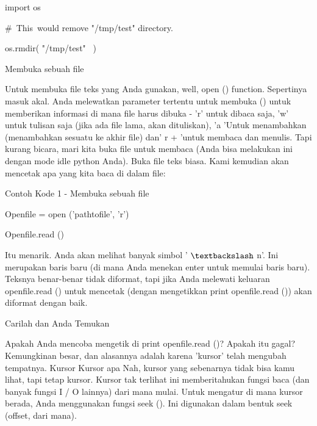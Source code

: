 \noindent 
import os \par
\vspace{12pt}
\noindent 
 $  \#  $~This~would  remove "/tmp/test"  directory. \par
\noindent 
os.rmdir( "/tmp/test"~ ) \par
\vspace{14pt}
\vspace{14pt}
\noindent 
Membuka sebuah file \par
\noindent 
\vspace{12pt}
\noindent 
Untuk membuka file teks yang Anda gunakan, well, open () function. Sepertinya masuk akal. Anda melewatkan parameter tertentu untuk membuka () untuk memberikan informasi di mana file harus dibuka - 'r' untuk dibaca saja, 'w' untuk tulisan saja (jika ada file lama, akan dituliskan), 'a 'Untuk menambahkan (menambahkan sesuatu ke akhir file) dan' r + 'untuk membaca dan menulis. Tapi kurang bicara, mari kita buka file untuk membaca (Anda bisa melakukan ini dengan mode idle python Anda). Buka file teks biasa. Kami kemudian akan mencetak apa yang kita baca di dalam file: \par
\noindent 
Contoh Kode 1 - Membuka sebuah file \par
\noindent 
\vspace{12pt}
\noindent 
Openfile = open ('pathtofile', 'r') \par
\noindent 
Openfile.read () \par
\noindent 
\vspace{12pt}
\noindent 
Itu menarik. Anda akan melihat banyak simbol ' $  \textbackslash  $ n'. Ini merupakan baris baru (di mana Anda menekan enter untuk memulai baris baru). Teksnya benar-benar tidak diformat, tapi jika Anda melewati keluaran openfile.read () untuk mencetak (dengan mengetikkan print openfile.read ()) akan diformat dengan baik. \par
\noindent 
Carilah dan Anda Temukan \par
\noindent 
\vspace{12pt}
\noindent 
Apakah Anda mencoba mengetik di print openfile.read ()? Apakah itu gagal? Kemungkinan besar, dan alasannya adalah karena 'kursor' telah mengubah tempatnya. Kursor Kursor apa Nah, kursor yang sebenarnya tidak bisa kamu lihat, tapi tetap kursor. Kursor tak terlihat ini memberitahukan fungsi baca (dan banyak fungsi I / O lainnya) dari mana mulai. Untuk mengatur di mana kursor berada, Anda menggunakan fungsi seek (). Ini digunakan dalam bentuk seek (offset, dari mana). \par
